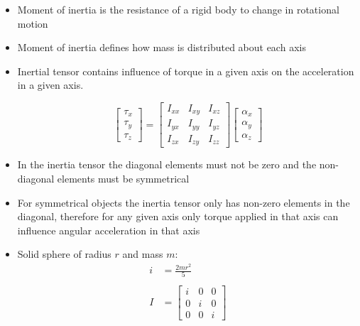 \documentclass[a4paper]{article}
\begin{document}
\begin{itemize}
  \item
    Moment of inertia is the resistance of a rigid body to change in rotational
    motion

  \item
    Moment of inertia defines how mass is distributed about each axis

  \item
    Inertial tensor contains influence of torque in a given axis on the
    acceleration in a given axis.

    \[
      \left [
        \begin{array}{c}
          \tau_{x} \\
          \tau_{y} \\
          \tau_{z}
        \end{array}
      \right ]
      =
      \left [
        \begin{array}{ccc}
          I_{xx} & I_{xy} & I_{xz} \\
          I_{yx} & I_{yy} & I_{yz} \\
          I_{zx} & I_{zy} & I_{zz}
        \end{array}
      \right ]
      \left [
        \begin{array}{c}
          \alpha_{x} \\
          \alpha_{y} \\
          \alpha_{z}
        \end{array}
      \right]
    \]

  \item
    In the inertia tensor the diagonal elements must not be zero and the
    non-diagonal elements must be symmetrical

  \item
    For symmetrical objects the inertia tensor only has non-zero elements in the
    diagonal, therefore for any given axis only torque applied in that axis can
    influence angular acceleration in that axis

  \item
    Solid sphere of radius $r$ and mass $m$:
    \begin{align*}
      i &= \frac{2mr^{2}}{5} \\
      \\
      I &= \left [
        \begin{array}{ccc}
          i & 0 & 0 \\
          0 & i & 0 \\
          0 & 0 & i
        \end{array}
      \right ]
    \end{align*}


\end{itemize}
\end{document}
